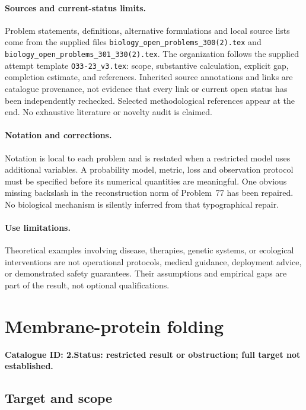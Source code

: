 \documentclass[11pt]{article}
\begin{document}
\paragraph{Sources and current-status limits.}
Problem statements, definitions, alternative formulations and local source lists
come from the supplied files
\texttt{biology\_open\_problems\_300(2).tex} and
\texttt{biology\_open\_problems\_301\_330(2).tex}.
The organization follows the supplied attempt template
\texttt{O33-23\_v3.tex}: scope, substantive calculation, explicit gap,
completion estimate, and references. Inherited source annotations and links are
catalogue provenance, not evidence that every link or current open status has
been independently rechecked. Selected methodological references appear at the
end. No exhaustive literature or novelty audit is claimed.

\paragraph{Notation and corrections.}
Notation is local to each problem and is restated when a restricted model uses
additional variables. A probability model, metric, loss and observation protocol
must be specified before its numerical quantities are meaningful. One obvious
missing backslash in the reconstruction norm of Problem~77 has been repaired.
No biological mechanism is silently inferred from that typographical repair.

\paragraph{Use limitations.}
Theoretical examples involving disease, therapies, genetic systems, or ecological
interventions are not operational protocols, medical guidance, deployment advice,
or demonstrated safety guarantees. Their assumptions and empirical gaps are part
of the result, not optional qualifications.

\setcounter{section}{1}
\section{Membrane-protein folding}
\label{prob:002}
\noindent\textbf{Catalogue ID: 2.}\quad \textbf{Status: restricted result or obstruction; full target not established.}
\subsection{Target and scope}
\end{document}
